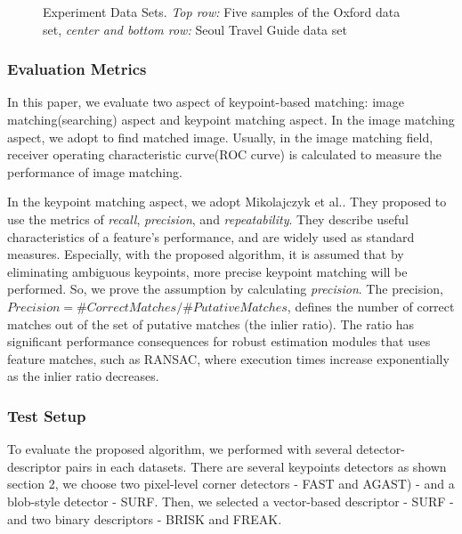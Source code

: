 \begin{figure}[ht!]
    \hfill
    \caption{Experiment Data Sets. \textit{Top row:} Five samples of the Oxford data set\cite{mikolajczyk_comparison_2005}, \textit{center and bottom row:} Seoul Travel Guide data set}
    \label{fig:experiments_datasets}
\end{figure}

\subsubsection{Evaluation Metrics}
In this paper, we evaluate two aspect of keypoint-based matching: image matching(searching) aspect and keypoint matching aspect. In the image matching aspect, we adopt \cite{sivic_efficient_2009} to find matched image. Usually, in the image matching field, receiver operating characteristic curve(ROC curve) is calculated to measure the performance of image matching.

In the keypoint matching aspect, we adopt Mikolajczyk et al.\cite{mikolajczyk_comparison_2005,mikolajczyk_performance_2005}. They proposed to use the metrics of \textit{recall}, \textit{precision}, and \textit{repeatability}. They describe useful characteristics of a feature's performance, and are widely used as standard measures. Especially, with the proposed algorithm, it is assumed that by eliminating ambiguous keypoints, more precise keypoint matching will be performed. So, we prove the assumption by calculating \textit{precision}. The precision, $Precision = \#Correct Matches / \# Putative Matches$\cite{mikolajczyk_performance_2005}, defines the number of correct matches out of the set of putative matches (the inlier ratio). The ratio has significant performance consequences for robust estimation modules that uses feature matches, such as RANSAC\cite{fischler_random_1981}, where execution times increase exponentially as the inlier ratio decreases. 

\subsubsection{Test Setup}
To evaluate the proposed algorithm, we performed with several detector-descriptor pairs in each datasets. There are several keypoints detectors as shown section 2, we choose two pixel-level corner detectors - FAST\cite{rosten_machine_2006} and AGAST\cite{mair_adaptive_2010}) - and a blob-style detector - SURF\cite{bay_speeded-up_2008}. Then, we selected a vector-based descriptor - SURF - and two binary descriptors - BRISK\cite{leutenegger_brisk:_2011} and FREAK\cite{alahi_freak:_2012}.

